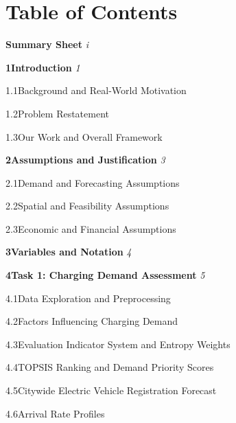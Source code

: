 \documentclass[11pt]{article}
\begin{document}
\newpage
\section*{Table of Contents}

\vspace{0.5em}

\noindent\textbf{Summary Sheet} \dotfill \textit{i}

\vspace{0.2em}
\noindent\textbf{1\quad Introduction} \dotfill \textit{1}
\vspace{-0.4em}
\begin{list}{}{\setlength{\leftmargin}{2.5em}\setlength{\itemsep}{0pt}\setlength{\topsep}{0pt}\setlength{\parsep}{0pt}}
\item 1.1\quad Background and Real-World Motivation 
\item 1.2\quad Problem Restatement 
\item 1.3\quad Our Work and Overall Framework 
\end{list}

\vspace{0.2em}
\noindent\textbf{2\quad Assumptions and Justification} \dotfill \textit{3}
\vspace{-0.4em}
\begin{list}{}{\setlength{\leftmargin}{2.5em}\setlength{\itemsep}{0pt}\setlength{\topsep}{0pt}\setlength{\parsep}{0pt}}
\item 2.1\quad Demand and Forecasting Assumptions 
\item 2.2\quad Spatial and Feasibility Assumptions 
\item 2.3\quad Economic and Financial Assumptions 
\end{list}

\vspace{0.2em}
\noindent\textbf{3\quad Variables and Notation} \dotfill \textit{4}

\vspace{0.2em}
\noindent\textbf{4\quad Task 1: Charging Demand Assessment} \dotfill \textit{5}
\vspace{-0.4em}
\begin{list}{}{\setlength{\leftmargin}{2.5em}\setlength{\itemsep}{0pt}\setlength{\topsep}{0pt}\setlength{\parsep}{0pt}}
\item 4.1\quad Data Exploration and Preprocessing 
\item 4.2\quad Factors Influencing Charging Demand 
\item 4.3\quad Evaluation Indicator System and Entropy Weights 
\item 4.4\quad TOPSIS Ranking and Demand Priority Scores 
\item 4.5\quad Citywide Electric Vehicle Registration Forecast 
\item 4.6\quad Arrival Rate Profiles 
\end{list}
\end{document}

